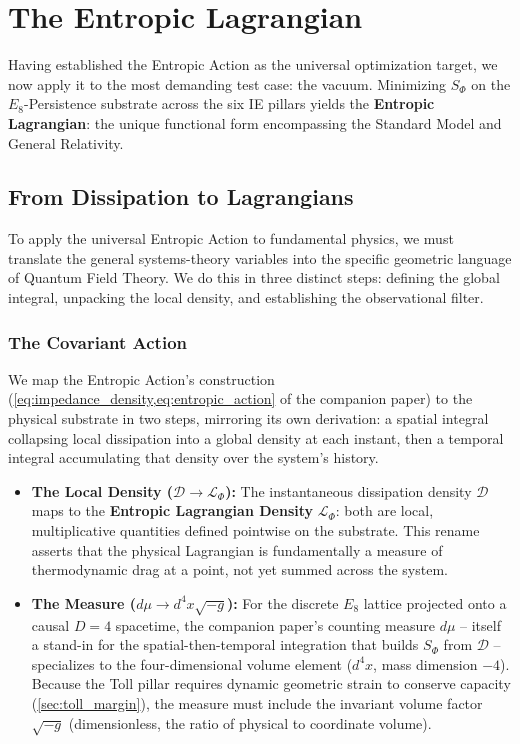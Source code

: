 \section{The Entropic Lagrangian}
\label{sec:entropic_lagrangian}

Having established the Entropic Action as the universal optimization target, we now apply it to the most demanding test case: the vacuum. Minimizing $S_\Phi$ on the $E_8$-Persistence substrate across the six IE pillars yields 
the \textbf{Entropic Lagrangian}: the unique functional form encompassing the Standard Model and General Relativity.

\subsection{From Dissipation to Lagrangians}
\label{sec:physics_translation}

To apply the universal Entropic Action to fundamental physics, we must translate the general systems-theory variables into the specific geometric language of Quantum Field Theory. We do this in three distinct steps: defining the global integral, unpacking the local density, and establishing the observational filter.

\subsubsection{The Covariant Action}
We map the Entropic Action's construction
(\cref{eq:impedance_density,eq:entropic_action} of the companion
paper\cite{meyer_informational_2026}) to the physical substrate in two
steps, mirroring its own derivation: a spatial integral collapsing
local dissipation into a global density at each instant, then a
temporal integral accumulating that density over the system's history.

\begin{itemize}
    \item \textbf{The Local Density ($\mathcal{D} \to \mathcal{L}_\Phi$):}
    The instantaneous dissipation density $\mathcal{D}$ maps to the
    \textbf{Entropic Lagrangian Density} $\mathcal{L}_\Phi$: both are
    local, multiplicative quantities defined pointwise on the
    substrate. This rename asserts that the physical Lagrangian is
    fundamentally a measure of thermodynamic drag at a point, not yet
    summed across the system.

    \item \textbf{The Measure ($d\mu \to d^4x\sqrt{-g}$):} For the
    discrete $E_8$ lattice projected onto a causal $D=4$ spacetime,
    the companion paper's counting measure $d\mu$ -- itself a stand-in
    for the spatial-then-temporal integration that builds $S_\Phi$ from
    $\mathcal{D}$ -- specializes to the four-dimensional volume element
    ($d^4x$, mass dimension $-4$). Because the Toll pillar requires
    dynamic geometric strain to conserve capacity (\cref{sec:toll_margin}),
    the measure must include the invariant volume factor $\sqrt{-g}$
    (dimensionless, the ratio of physical to coordinate volume).
\end{itemize}

